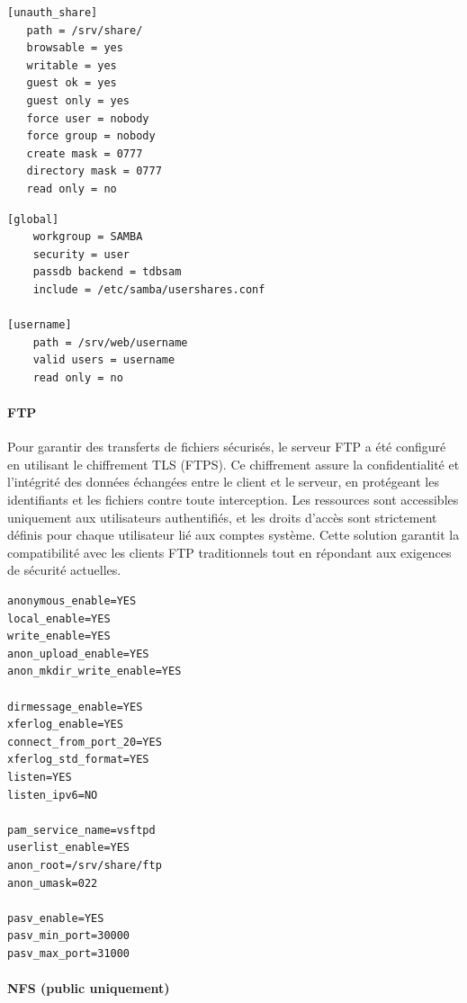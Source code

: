 \documentclass[a4paper,12pt]{article}
\begin{document}
\begin{lstlisting}[caption={Configuration Samba – /etc/samba/smb.unauth.conf}]
[unauth_share]
   path = /srv/share/
   browsable = yes
   writable = yes
   guest ok = yes
   guest only = yes
   force user = nobody
   force group = nobody
   create mask = 0777
   directory mask = 0777
   read only = no
\end{lstlisting}

\begin{lstlisting}[caption={Configuration Samba – /etc/samba/smb.conf}]
[global]
    workgroup = SAMBA
    security = user
    passdb backend = tdbsam
    include = /etc/samba/usershares.conf
        
[username]
    path = /srv/web/username
    valid users = username
    read only = no
\end{lstlisting}

\paragraph{FTP}

Pour garantir des transferts de fichiers sécurisés, le serveur FTP a été configuré en utilisant le chiffrement TLS (FTPS). Ce chiffrement assure la confidentialité et l'intégrité des données échangées entre le client et le serveur, en protégeant les identifiants et les fichiers contre toute interception. Les ressources sont accessibles uniquement aux utilisateurs authentifiés, et les droits d'accès sont strictement définis pour chaque utilisateur lié aux comptes système. Cette solution garantit la compatibilité avec les clients FTP traditionnels tout en répondant aux exigences de sécurité actuelles.

\begin{lstlisting}[caption={Configuration FTP vsftpd – /etc/vsftpd/vsftpd.conf}]
anonymous_enable=YES
local_enable=YES
write_enable=YES
anon_upload_enable=YES
anon_mkdir_write_enable=YES

dirmessage_enable=YES
xferlog_enable=YES
connect_from_port_20=YES
xferlog_std_format=YES
listen=YES
listen_ipv6=NO

pam_service_name=vsftpd
userlist_enable=YES
anon_root=/srv/share/ftp
anon_umask=022

pasv_enable=YES
pasv_min_port=30000
pasv_max_port=31000
\end{lstlisting}

\paragraph{NFS (public uniquement)}
\end{document}

